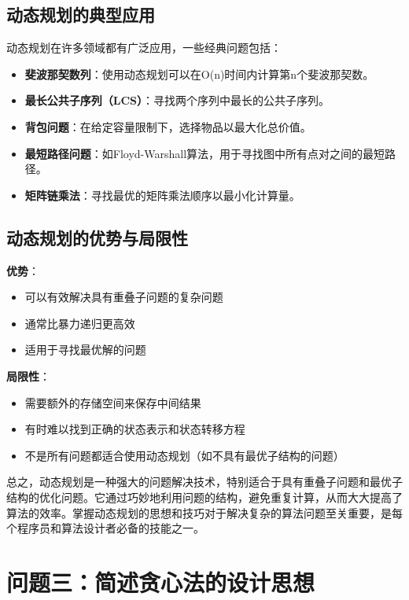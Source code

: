 \documentclass[12pt]{article}
\begin{document}
\subsection{动态规划的典型应用}

动态规划在许多领域都有广泛应用，一些经典问题包括：

\begin{itemize}
\item \textbf{斐波那契数列}：使用动态规划可以在O(n)时间内计算第n个斐波那契数。


\item \textbf{最长公共子序列（LCS）}：寻找两个序列中最长的公共子序列。

\item \textbf{背包问题}：在给定容量限制下，选择物品以最大化总价值。

\item \textbf{最短路径问题}：如Floyd-Warshall算法，用于寻找图中所有点对之间的最短路径。

\item \textbf{矩阵链乘法}：寻找最优的矩阵乘法顺序以最小化计算量。
\end{itemize}

\subsection{动态规划的优势与局限性}

\textbf{优势}：
\begin{itemize}
\item 可以有效解决具有重叠子问题的复杂问题
\item 通常比暴力递归更高效
\item 适用于寻找最优解的问题
\end{itemize}

\textbf{局限性}：
\begin{itemize}
\item 需要额外的存储空间来保存中间结果
\item 有时难以找到正确的状态表示和状态转移方程
\item 不是所有问题都适合使用动态规划（如不具有最优子结构的问题）
\end{itemize}

总之，动态规划是一种强大的问题解决技术，特别适合于具有重叠子问题和最优子结构的优化问题。它通过巧妙地利用问题的结构，避免重复计算，从而大大提高了算法的效率。掌握动态规划的思想和技巧对于解决复杂的算法问题至关重要，是每个程序员和算法设计者必备的技能之一。


\section{问题三：简述贪心法的设计思想}
\end{document}
